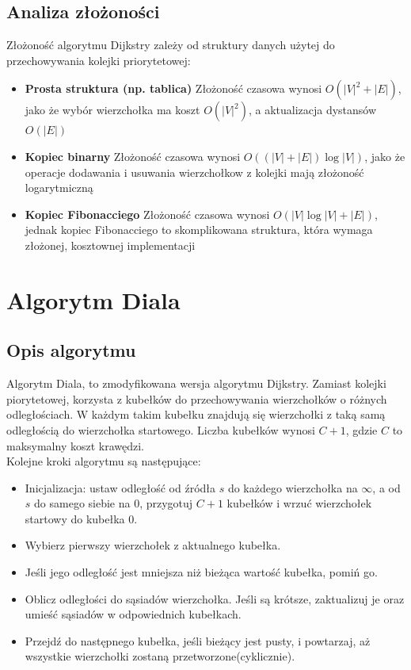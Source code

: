 \documentclass{article}
\begin{document}
\subsection{Analiza złożoności}
Złożoność algorytmu Dijkstry zależy od struktury danych użytej do przechowywania kolejki priorytetowej:

\begin{itemize}
    \item \textbf{Prosta struktura (np. tablica)} Złożoność czasowa wynosi $O(|V|^2 + |E|)$, jako że wybór wierzchołka ma koszt $O(|V|^2)$, a aktualizacja dystansów $O(|E|)$
    \item \textbf{Kopiec binarny} Złożoność czasowa wynosi $O((|V| + |E|) \log |V|)$, jako że operacje dodawania i usuwania wierzchołkow z kolejki mają złożoność logarytmiczną
    \item \textbf{Kopiec Fibonacciego} Złożoność czasowa wynosi $O(|V| \log |V| + |E|)$, jednak kopiec Fibonacciego to skomplikowana struktura, która wymaga złożonej, kosztownej implementacji
\end{itemize}

\section{Algorytm Diala}

\subsection{Opis algorytmu}
Algorytm Diala, to zmodyfikowana wersja algorytmu Dijkstry.
Zamiast kolejki piorytetowej, korzysta z kubełków do przechowywania wierzchołków o różnych odległościach.
W każdym takim kubełku znajdują się wierzchołki z taką samą odległością do wierzchołka startowego.
Liczba kubełków wynosi \( C + 1 \), gdzie \( C \) to maksymalny koszt krawędzi.\\

\noindent Kolejne kroki algorytmu są następujące:

\begin{itemize}
    \item Inicjalizacja: ustaw odległość od źródła \( s \) do każdego wierzchołka na \( \infty \), a od \( s \) do samego siebie na 0, przygotuj \( C+1 \) kubełków i wrzuć wierzchołek startowy do kubełka 0.
    \item Wybierz pierwszy wierzchołek z aktualnego kubełka.
    \item Jeśli jego odległość jest mniejsza niż bieżąca wartość kubełka, pomiń go.
    \item Oblicz odległości do sąsiadów wierzchołka. Jeśli są krótsze, zaktualizuj je oraz umieść sąsiadów w odpowiednich kubełkach.
    \item Przejdź do następnego kubełka, jeśli bieżący jest pusty, i powtarzaj, aż wszystkie wierzchołki zostaną przetworzone(cyklicznie).
\end{itemize}
\end{document}
